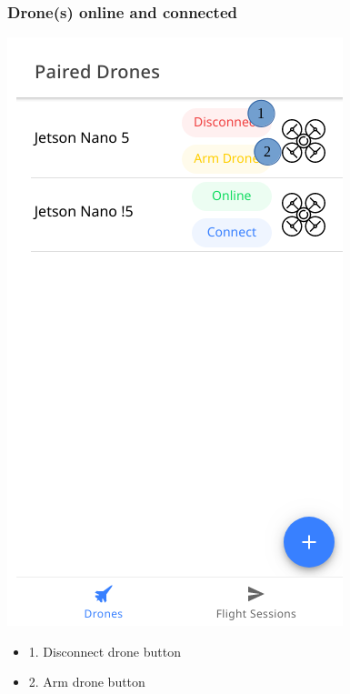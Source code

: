 \subsubsection{Drone(s) online and connected}
\begin{minipage}[c]{0.5\linewidth}
	\centering
	\includegraphics[scale=0.4]{./assets/images/connected.png}
	\label{fig: mainPageConnected}
\end{minipage}
\begin{minipage}[c]{0.5\linewidth}
	\begin{itemize}
			\item 1. Disconnect drone button
			\item 2. Arm drone button
	\end{itemize}
\end{minipage}

\newpage

